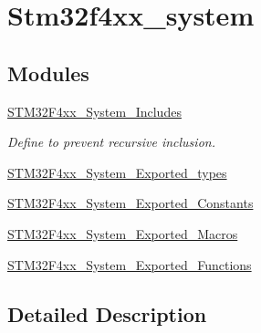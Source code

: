 \hypertarget{group__stm32f4xx__system}{}\section{Stm32f4xx\+\_\+system}
\label{group__stm32f4xx__system}
\subsection*{Modules}
\begin{DoxyCompactItemize}
\item 
\hyperlink{group___s_t_m32_f4xx___system___includes}{S\+T\+M32\+F4xx\+\_\+\+System\+\_\+\+Includes}
\begin{DoxyCompactList}\small\item\em Define to prevent recursive inclusion. \end{DoxyCompactList}\item 
\hyperlink{group___s_t_m32_f4xx___system___exported__types}{S\+T\+M32\+F4xx\+\_\+\+System\+\_\+\+Exported\+\_\+types}
\item 
\hyperlink{group___s_t_m32_f4xx___system___exported___constants}{S\+T\+M32\+F4xx\+\_\+\+System\+\_\+\+Exported\+\_\+\+Constants}
\item 
\hyperlink{group___s_t_m32_f4xx___system___exported___macros}{S\+T\+M32\+F4xx\+\_\+\+System\+\_\+\+Exported\+\_\+\+Macros}
\item 
\hyperlink{group___s_t_m32_f4xx___system___exported___functions}{S\+T\+M32\+F4xx\+\_\+\+System\+\_\+\+Exported\+\_\+\+Functions}
\end{DoxyCompactItemize}


\subsection{Detailed Description}
